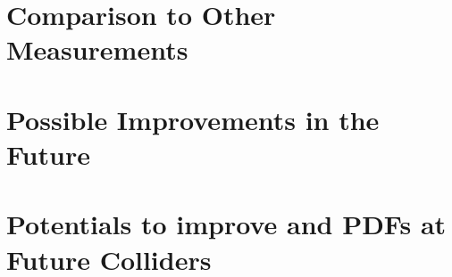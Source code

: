 \section{Comparison to Other Measurements}
\section{Possible Improvements in the Future}
\section{Potentials to improve \as and PDFs at Future Colliders}